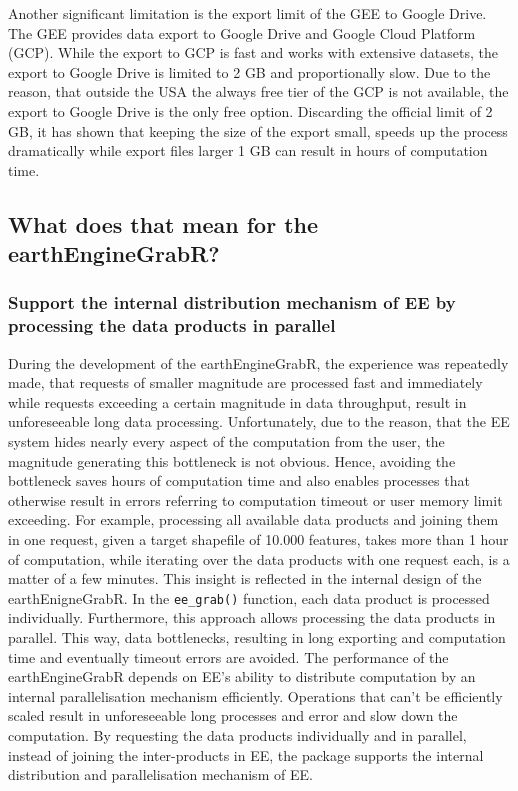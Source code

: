 Another significant limitation is the export limit of the GEE to Google Drive.
The GEE provides data export to Google Drive and Google Cloud Platform (GCP). While the export to GCP is fast and works with extensive datasets, the export to Google Drive is limited to 2 GB and proportionally slow. Due to the reason, that outside the USA the always free tier of the GCP is not available, the export to Google Drive is the only free option. Discarding the official limit of 2 GB, it has shown that keeping the size of the export small,  speeds up the process dramatically while export files larger 1 GB can result in hours of computation time. 

\subsection{What does that mean for the earthEngineGrabR?}

\subsubsection{Support the internal distribution mechanism of EE by processing the data products in parallel}

During the development of the earthEngineGrabR, the experience was repeatedly made, that requests of smaller magnitude are processed fast and immediately while requests exceeding a certain magnitude in data throughput, result in unforeseeable long data processing. Unfortunately, due to the reason, that the EE system hides nearly every aspect of the computation from the user, the magnitude generating this bottleneck is not obvious. Hence, avoiding the bottleneck saves hours of computation time and also enables processes that otherwise result in errors referring to computation timeout or user memory limit exceeding. For example, processing all available data products and joining them in one request, given a target shapefile of 10.000 features, takes more than 1 hour of computation, while iterating over the data products with one request each, is a matter of a few minutes. This insight is reflected in the internal design of the earthEnigneGrabR. In the \texttt{ee\_grab()} function, each data product is processed individually. Furthermore, this approach allows processing the data products in parallel. This way, data bottlenecks, resulting in long exporting and computation time and eventually timeout errors are avoided. The performance of the earthEngineGrabR depends on EE's ability to distribute computation by an internal parallelisation mechanism efficiently. Operations that can't be efficiently scaled result in unforeseeable long processes and error and slow down the computation. By requesting the data products individually and in parallel, instead of joining the inter-products in EE, the package supports the internal distribution and parallelisation mechanism of EE.

